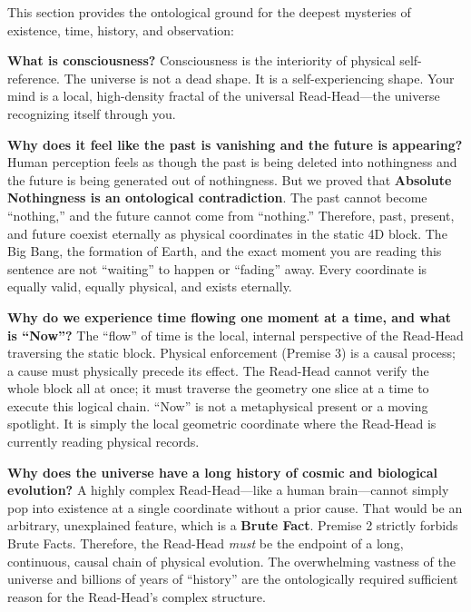 \documentclass[11pt]{article}
\theoremstyle{canonstyle}
\begin{document}
\begin{realization}
This section provides the ontological ground for the deepest mysteries of existence, time, history, and observation:

\medskip

\textbf{What is consciousness?}
Consciousness is the interiority of physical self-reference. The universe is not a dead shape. It is a self-experiencing shape. Your mind is a local, high-density fractal of the universal Read-Head---the universe recognizing itself through you.

\textbf{Why does it feel like the past is vanishing and the future is appearing?}
Human perception feels as though the past is being deleted into nothingness and the future is being generated out of nothingness. But we proved that \textbf{Absolute Nothingness is an ontological contradiction}. The past cannot become ``nothing,'' and the future cannot come from ``nothing.'' Therefore, past, present, and future coexist eternally as physical coordinates in the static 4D block. The Big Bang, the formation of Earth, and the exact moment you are reading this sentence are not ``waiting'' to happen or ``fading'' away. Every coordinate is equally valid, equally physical, and exists eternally.

\textbf{Why do we experience time flowing one moment at a time, and what is ``Now''?}
The ``flow'' of time is the local, internal perspective of the Read-Head traversing the static block. Physical enforcement (Premise 3) is a causal process; a cause must physically precede its effect. The Read-Head cannot verify the whole block all at once; it must traverse the geometry one slice at a time to execute this logical chain. ``Now'' is not a metaphysical present or a moving spotlight. It is simply the local geometric coordinate where the Read-Head is currently reading physical records.

\textbf{Why does the universe have a long history of cosmic and biological evolution?}
A highly complex Read-Head---like a human brain---cannot simply pop into existence at a single coordinate without a prior cause. That would be an arbitrary, unexplained feature, which is a \textbf{Brute Fact}. Premise 2 strictly forbids Brute Facts. Therefore, the Read-Head \emph{must} be the endpoint of a long, continuous, causal chain of physical evolution. The overwhelming vastness of the universe and billions of years of ``history'' are the ontologically required sufficient reason for the Read-Head's complex structure.


\end{realization}
\end{document}
